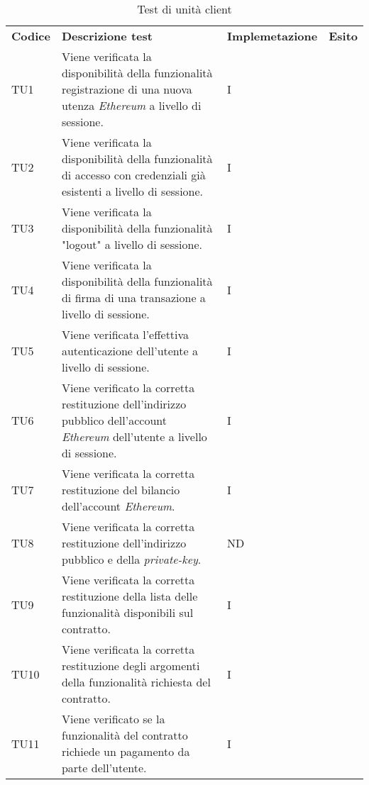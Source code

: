 \renewcommand{\arraystretch}{1.5}
\begin{longtable}{|C{1.5cm}|C{8cm}|C{3cm}|C{1cm}|}

	\caption{Test di unità client}\\
	\hline

	\textbf{Codice} & \textbf{Descrizione test}  & \textbf{Implemetazione}& \textbf{Esito}
	\tabularnewline
	\endfirsthead

	TU1 &
	Viene verificata la disponibilità della funzionalità registrazione di una nuova utenza \textit{Ethereum\glo} a livello di sessione.  &
	I \\

	TU2 &
	Viene verificata la disponibilità della funzionalità di accesso con credenziali già esistenti a livello di sessione.  &
	I \\

	TU3 &
	Viene verificata la disponibilità della funzionalità "logout" a livello di sessione.  &
	I \\

	TU4 &
	Viene verificata la disponibilità della funzionalità di firma di una transazione a livello di sessione.  &
	I \\

	TU5 &
	Viene verificata l'effettiva autenticazione dell'utente a livello di sessione.  &
	I \\

	TU6 &
	Viene verificato la corretta restituzione dell'indirizzo pubblico dell'account \textit{Ethereum\glo} dell'utente a livello di sessione.  &
	I \\

	TU7 &
	Viene verificata la corretta restituzione del bilancio dell'account \textit{Ethereum\glos}.  &
	I \\

	TU8 &
	Viene verificata la corretta restituzione dell'indirizzo pubblico e della \textit{private-key\glos}.  &
	ND \\

	TU9 &
	Viene verificata la corretta restituzione della lista delle funzionalità disponibili sul contratto.  &
	I \\

	TU10 &
	Viene verificata la corretta restituzione degli argomenti della funzionalità richiesta del contratto.  &
	I \\

	TU11 &
	Viene verificato se la funzionalità del contratto richiede un pagamento da parte dell'utente.  &
	I \\


\end{longtable}

